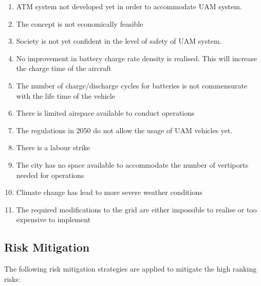 \begin{enumerate}
    \item ATM system not developed yet in order to accommodate UAM system.
    \item The concept is not economically feasible 
    \item Society is not yet confident in the level of safety of UAM system.
    \item No improvement in battery charge rate density is realised. This will increase the charge time of the aircraft
    \item The number of charge/discharge cycles for batteries is not commensurate with the life time of the vehicle 
    \item There is limited airspace available to conduct operations 
    \item The regulations in 2050 do not allow the usage of UAM vehicles yet.
    \item There is a labour strike
    \item The city has no space available to accommodate the number of vertiports needed for operations 
    \item Climate change has lead to more severe weather conditions 
    \item The required modifications to the grid are either impossible to realise or too expensive to implement
\end{enumerate}


\subsection{Risk Mitigation}
\label{sec:riskmit}
The following risk mitigation strategies are applied to mitigate the high ranking risks: 

